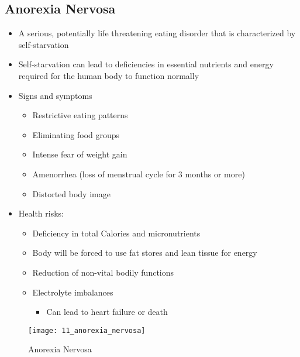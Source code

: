 \documentclass[title={Chapter 11}]{fdsn201notes}
\begin{document}
\subsection{Anorexia Nervosa}\label{subsec:anorexia-nervosa}
\begin{itemize}
	\item A serious, potentially life threatening eating disorder that is characterized by self-starvation
	\item Self-starvation can lead to deficiencies in essential nutrients and energy required for the human body to function normally
	\item Signs and symptoms
	\begin{itemize}
		\item Restrictive eating patterns
		\item Eliminating food groups
		\item Intense fear of weight gain
		\item Amenorrhea (loss of menstrual cycle for 3 months or more)
		\item Distorted body image
	\end{itemize}
	\item Health risks:
	\begin{itemize}
		\item Deficiency in total Calories and micronutrients
		\item Body will be forced to use fat stores and lean tissue for energy
		\item Reduction of non-vital bodily functions
		\item Electrolyte imbalances
		\begin{itemize}
			\item Can lead to heart failure or death
		\end{itemize}
	\end{itemize}
\end{itemize}

\begin{figure}[H]
	\centering
	\texttt{[image: 11\_anorexia\_nervosa]}
	\caption{Anorexia Nervosa}
	\label{fig:anorexia-nervosa}
\end{figure}
\end{document}
